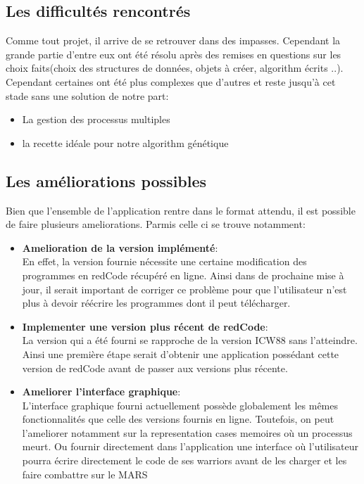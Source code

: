 \documentclass[12pt]{article}
\begin{document}
\subsection{Les difficultés rencontrés}
Comme tout projet, il arrive de se retrouver dans des impasses. Cependant la grande partie d'entre eux ont été résolu après des remises en questions sur les choix faits(choix des structures de données, objets à créer, algorithm écrits ..). Cependant certaines ont été plus complexes que d'autres et reste jusqu'à cet stade sans une solution de notre part:
\begin{itemize}
	\item La gestion des processus multiples
	\item la recette idéale pour notre algorithm génétique
\end{itemize}
\subsection{Les améliorations possibles}
Bien que l'ensemble de l'application rentre dans le format attendu, il est possible de faire plusieurs ameliorations.
Parmis celle ci se trouve notamment:
\begin{itemize}
	\item \textbf{Amelioration de la version implémenté}:\\
		En effet, la version fournie nécessite une certaine modification des programmes en redCode récupéré en ligne. Ainsi dans de prochaine mise
		à jour, il serait important de corriger ce problème pour que l'utilisateur n'est plus à devoir réécrire les programmes dont il peut télécharger.
	
	\item \textbf{Implementer une version plus récent de redCode}:\\
		La version qui a été fourni se rapproche de la version ICW88 sans l'atteindre. Ainsi une première étape serait d'obtenir une application
		possédant cette version de redCode avant de passer aux versions plus récente.
	
	\item \textbf{Ameliorer l'interface graphique}:\\
		L'interface graphique fourni actuellement possède globalement les mêmes fonctionnalités que celle des versions fournis en ligne.
		Toutefois, on peut l'ameliorer notamment sur la representation cases memoires où un processus meurt. Ou fournir directement dans l'application
		une interface où l'utilisateur pourra écrire directement le code de ses warriors avant de les charger et les faire combattre sur le MARS
\end{itemize}
\end{document}
